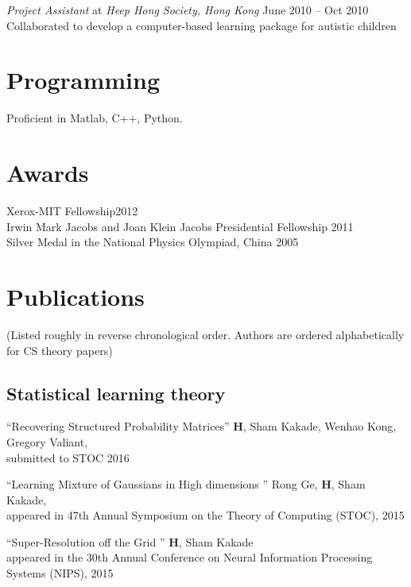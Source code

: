 \documentclass[margin,line,11pt]{resume}
\begin{document}
\begin{resume}
{\sl Project Assistant} at {\sl Heep Hong Society, Hong Kong} \hfill June 2010 -- Oct 2010
\\
Collaborated to develop a computer-based learning package for autistic children


\section{\mysidestyle Programming}
Proficient in Matlab, C++, Python.


\section{\mysidestyle Awards}
{Xerox-MIT Fellowship}\hfill 2012\\
{Irwin Mark Jacobs and Joan Klein Jacobs Presidential Fellowship } \hfill 2011\\
{ Silver Medal in the National Physics Olympiad, China} \hfill 2005\\



\newpage
\small
\section{\mysidestyle Publications}
(Listed roughly in reverse chronological order.  Authors are ordered alphabetically for CS
theory papers)


\vspace{-5mm}
\subsection{\small\sc\textbf{Statistical learning theory}}
\vspace{-5mm}

``Recovering Structured Probability Matrices''
\textbf{H}, Sham Kakade, Wenhao Kong, Gregory Valiant,
\\
submitted to STOC 2016

``Learning Mixture of Gaussians in High dimensions ''
Rong Ge, \textbf{H}, Sham Kakade,
\\
appeared in 47th Annual Symposium on the Theory of Computing (STOC), 2015

``Super-Resolution off the Grid '' \textbf{H}, Sham Kakade
\\
appeared in the 30th Annual Conference on Neural Information Processing Systems (NIPS), 2015


\end{resume}
\end{document}

